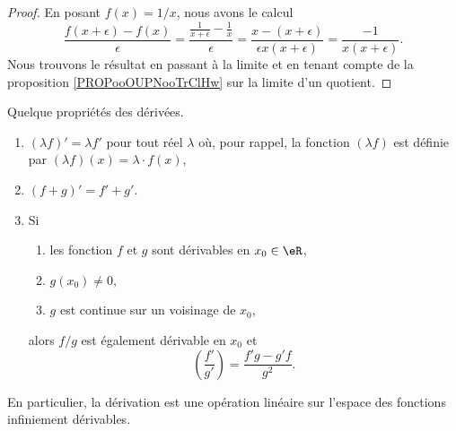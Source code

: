 \begin{proof}
    En posant \( f(x)=1/x\), nous avons le calcul
    \begin{equation}
        \frac{ f(x+\epsilon)-f(x) }{ \epsilon }=\frac{ \frac{1}{ x+\epsilon }-\frac{1}{ x } }{ \epsilon }=\frac{ x-(x+\epsilon) }{ \epsilon x(x+\epsilon) }=\frac{ -1 }{ x(x+\epsilon) }.
    \end{equation}
    Nous trouvons le résultat en passant à la limite et en tenant compte de la proposition \ref{PROPooOUPNooTrClHw} sur la limite d'un quotient.
\end{proof}

\begin{proposition}     \label{PropDerrLin}
    Quelque propriétés des dérivées.
    \begin{enumerate}
        \item   \label{ITEMooLRQLooNoXeEe}
            $(\lambda f)'=\lambda f'$ pour tout réel $\lambda$ où, pour rappel, la fonction $(\lambda f)$ est définie par $(\lambda f)(x)=\lambda\cdot f(x)$,
        \item   \label{ITEMooGHJHooQXsajQ}
            $(f+g)'=f'+g'$.
        \item
            Si 
            \begin{enumerate}
                \item
                    les fonction \( f\) et \( g\) sont dérivables en \( x_0\in \eR\),
                \item
                    \( g(x_0)\neq 0\),
                \item
                    \( g\) est continue sur un voisinage de \( x_0\),
            \end{enumerate}
            alors \( f/g\) est également dérivable en \( x_0\) et 
            \begin{equation}
                \left( \frac{ f' }{ g' } \right)=\frac{ f'g-g'f }{ g^2 }.
            \end{equation}
    \end{enumerate}
    En particulier, la dérivation est une opération linéaire sur l'espace des fonctions infiniement dérivables.
\end{proposition}

